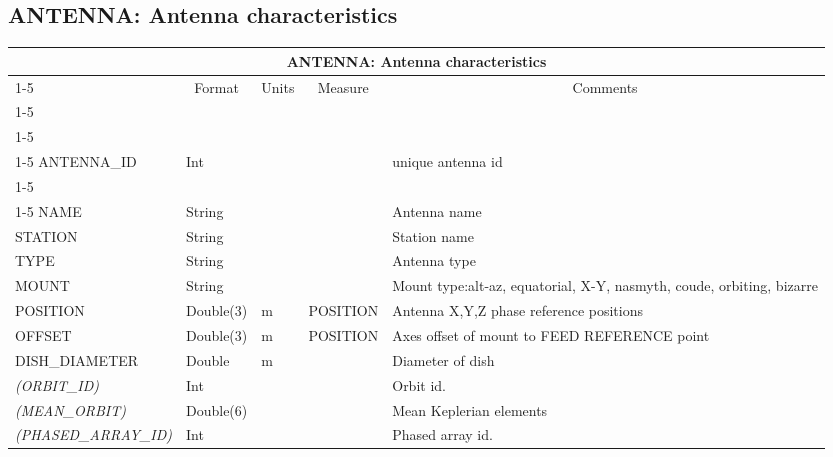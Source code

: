 \documentclass{article}
\newcommand{\defline}[1]{\cline{1-5}
\multicolumn{5}{|l|}{#1} \\
\cline{1-5}}
\newcommand{\definetable}[2]
{
	\vfill\newpage
	\subsection{#1}
        \vspace{0.15in}
        \small
	\begin{tabular}{|l|p{1.25in}|l|p{.9in}|p{1.4in}|}
	\hline
	\multicolumn{5}{|c|}{\bf #1}\\ 
	\cline{1-5}
        \multicolumn{1}{|c|}{Name}&\multicolumn{1}{|c|}{Format}&
        \multicolumn{1}{|c|}{Units}&\multicolumn{1}{|c|}{Measure}&
        \multicolumn{1}{|c|}{Comments}\\
        \cline{1-5}
        #2
        \hline
	\end{tabular}
}
\begin{document}
\definetable{ANTENNA: Antenna characteristics}
{
\defline{\bf Columns}
\defline{\bf Keys}
ANTENNA\_ID &  Int &  &  &  unique antenna id \\
\defline{\em Data}
NAME &       String &  & &  Antenna name \\
STATION &        String & & &  Station name \\
TYPE  &  String &     &      & Antenna type \\
MOUNT  & String &  & &   Mount type:alt-az, equatorial, X-Y, nasmyth, coude, orbiting, bizarre \\
POSITION &   Double(3) &  m   &     POSITION &   Antenna X,Y,Z phase reference positions \\
OFFSET & Double(3)  &   m &     POSITION & Axes offset of mount to FEED REFERENCE point \\
DISH\_DIAMETER &  Double &  m  &      & Diameter of dish\\
{\it (ORBIT\_ID)}    &    Int & & &  Orbit id. \\
{\it (MEAN\_ORBIT)}  &    Double(6) & & & Mean Keplerian elements\\
{\it (PHASED\_ARRAY\_ID)} & Int   &  & &   Phased array id.\\
}
\end{document}
